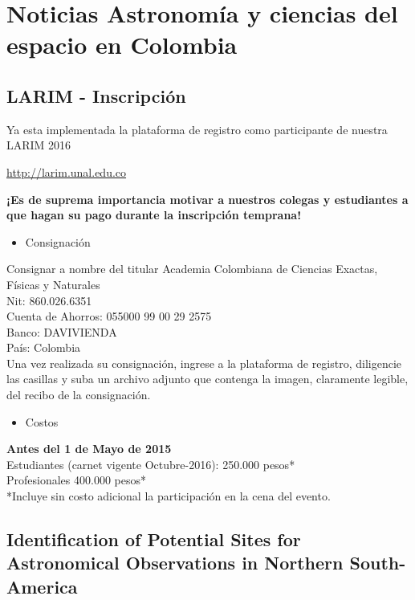 \documentclass{book}
\begin{document}
\newcommand{\theimage}{fig22.jpg}
 
\tableofcontents{}

\section*{Noticias Astronomía y ciencias del espacio en Colombia}
\subsection{LARIM - Inscripción}

Ya esta implementada la plataforma de registro como participante de nuestra LARIM 2016
\begin{center}
\url{http://larim.unal.edu.co}
\end{center}
\textbf{¡Es de suprema importancia motivar a nuestros colegas y estudiantes a que hagan su pago durante la inscripción temprana!}
\begin{itemize}
\item Consignación
\end{itemize}
Consignar a nombre del titular Academia Colombiana de Ciencias Exactas, Físicas y Naturales\\
Nit: 860.026.6351\\
Cuenta de Ahorros: 055000 99 00 29 2575\\
Banco: DAVIVIENDA\\
País: Colombia\\
Una vez realizada su consignación, ingrese a la plataforma de registro, diligencie las casillas y  suba un archivo adjunto que contenga la imagen, claramente legible, del recibo de la consignación. 
\begin{itemize}
\item Costos
\end{itemize}
\textbf{Antes del 1 de Mayo de 2015}\\
Estudiantes (carnet vigente Octubre-2016): 250.000 pesos*\\
Profesionales 400.000 pesos*\\
*Incluye sin costo adicional la participación en la cena del evento.
\newpage
\subsection{Identification of Potential Sites for Astronomical Observations in Northern South-America}
\end{document}
